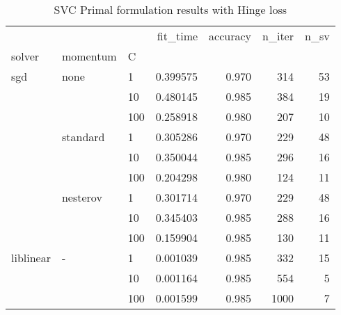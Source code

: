 \begin{table}[H]
\centering
\caption{SVC Primal formulation results with Hinge loss}
\label{primal_svc_hinge_cv_results}
\begin{tabular}{lllrrrr}
\toprule
          &   &     &  fit\_time &  accuracy &  n\_iter &  n\_sv \\
solver & momentum & C &           &           &         &       \\
\midrule
sgd & none & 1   &  0.399575 &     0.970 &     314 &    53 \\
          &   & 10  &  0.480145 &     0.985 &     384 &    19 \\
          &   & 100 &  0.258918 &     0.980 &     207 &    10 \\
          & standard & 1   &  0.305286 &     0.970 &     229 &    48 \\
          &   & 10  &  0.350044 &     0.985 &     296 &    16 \\
          &   & 100 &  0.204298 &     0.980 &     124 &    11 \\
          & nesterov & 1   &  0.301714 &     0.970 &     229 &    48 \\
          &   & 10  &  0.345403 &     0.985 &     288 &    16 \\
          &   & 100 &  0.159904 &     0.985 &     130 &    11 \\
liblinear & - & 1   &  0.001039 &     0.985 &     332 &    15 \\
          &   & 10  &  0.001164 &     0.985 &     554 &     5 \\
          &   & 100 &  0.001599 &     0.985 &    1000 &     7 \\
\bottomrule
\end{tabular}
\end{table}

